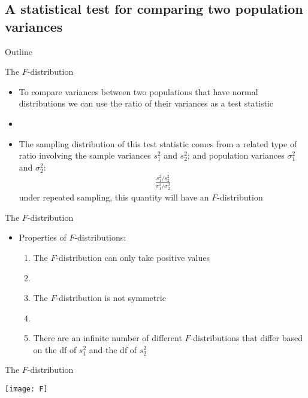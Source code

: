 \documentclass[xcolor=dvipsnames]{beamer}
\begin{document}
\subsection{A statistical test for comparing two population variances}
\begin{frame}{Outline}
	\tableofcontents[currentsection,subsectionstyle=show/shaded/hide]
\end{frame}

\begin{frame}{The $F$-distribution}
	\begin{itemize}
		\item To compare variances between two populations that have normal distributions we can use the ratio of their variances as a test statistic
		\item[]
		\item The sampling distribution of this test statistic comes from a related type of ratio involving the sample variances $s_1^2$ and $s_2^2$; and population variances $\sigma_1^2$ and $\sigma_2^2$:
		\begin{gather*}
		\frac{s_1^2 / s_2^2}{\sigma_1^2 / \sigma_2^2}
		\end{gather*}
		under repeated sampling, this quantity will have an $F$-distribution
	\end{itemize}
\end{frame}

\begin{frame}{The $F$-distribution}
	\begin{itemize}
		\item Properties of $F$-distributions:
		\begin{enumerate}
			\item The $F$-distribution can only take positive values
			\item[]
			\item The $F$-distribution is not symmetric
			\item[]
			\item There are an infinite number of different $F$-distributions that differ based on the df of $s_1^2$ and the df of $s_2^2$
			\end{enumerate}
	\end{itemize}
\end{frame}

\begin{frame}{The $F$-distribution}
	\begin{center}
		\texttt{[image: F]}
	\end{center}
\end{frame}
\end{document}
